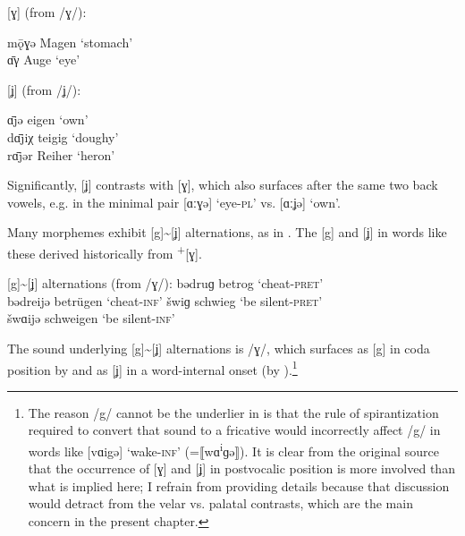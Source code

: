 \ea%
\label{ex:9:11} [ɣ] (from /ɣ/):\\
    \begin{xlist}
    \sn
    mǭɣə \tab [mɔːɣə] \tab Magen \tab ‘stomach’ \\
    ɑ̄γ   \tab [ɑːɣ]   \tab Auge  \tab ‘eye’     
    \end{xlist}
\ex%
\label{ex:9:12} [ʝ] (from /ʝ/):\\
    \begin{xlist}
    \sn
    ɑ̄jə   \tab [ɑːʝə]   \tab eigen  \tab ‘own’    \\
    dɑ̄jiχ \tab [dɑːʝiç] \tab teigig \tab ‘doughy’ \\
    rɑ̄jər \tab [rɑːʝər] \tab Reiher \tab ‘heron’  \\
    \end{xlist}
\z 

Significantly, [ʝ] contrasts with [ɣ], which also surfaces after the same two back vowels, e.g. in the minimal pair [ɑːɣə] ‘eye-\textsc{pl}’ vs. [ɑːʝə] ‘own’.

Many morphemes exhibit [g]{\textasciitilde}[ʝ] alternations, as in . The [g] and [ʝ] in words like these derived historically from  \textsuperscript{+}[ɣ].

\ea%
\label{ex:9:13} [g]{\textasciitilde}[ʝ] alternations (from /ɣ/):
\ea\label{ex:9:13a} bədruɡ   \tab [bədrug]   \tab betrog    \tab ‘cheat-\textsc{pret}’    \\
    bədreijə \tab [bədreiʝə] \tab betrügen  \tab ‘cheat-\textsc{inf}’       
\ex\label{ex:9:13b} šwiɡ     \tab [ʃvig]     \tab schwieg   \tab ‘be silent-\textsc{pret}’ \\
    šwɑijə   \tab [ʃvɑiʝə]   \tab schweigen \tab ‘be silent-\textsc{inf}’   
 \z
\z 

The sound underlying [g]{\textasciitilde}[ʝ] alternations is /ɣ/, which surfaces as [g] in coda position by  and as [ʝ] in a word-internal onset (by ).\footnote{{The reason /g/ cannot be the underlier in  is that the rule of spirantization required to convert that sound to a fricative would incorrectly affect /g/ in words like [vɑigə] ‘wake-}\textrm{\textsc{inf}}\textrm{’ (=⟦wɑ}\textrm{\textsuperscript{i}}\textrm{ɡə⟧). It is clear from the original source that the occurrence of [ɣ] and [ʝ] in postvocalic position is more involved than what is implied here; I refrain from providing details because that discussion would detract from the velar vs. palatal contrasts, which are the main concern in the present chapter.} }

